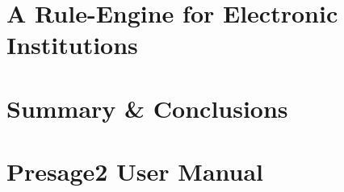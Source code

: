 \documentclass[ oneside,openright,titlepage,numbers=noenddot,headinclude,%
                footinclude=true,cleardoublepage=empty,abstractoff, %
                BCOR=5mm,paper=a4,fontsize=11pt,%
                english,%
                ]{scrreprt}
\begin{document}
\raggedbottom
\onehalfspacing
{} %
\pagestyle{plain}
%

%
\cleardoublepage
\cleardoublepage
\pagestyle{scrheadings}
\cleardoublepage
\cleardoublepage

%


\chapter{A Rule-Engine for Electronic Institutions}

\chapter{Summary \& Conclusions}
\cleardoublepage
\appendix
\cleardoublepage
\chapter{Presage2 User Manual}
%
\cleardoublepage
\end{document}
